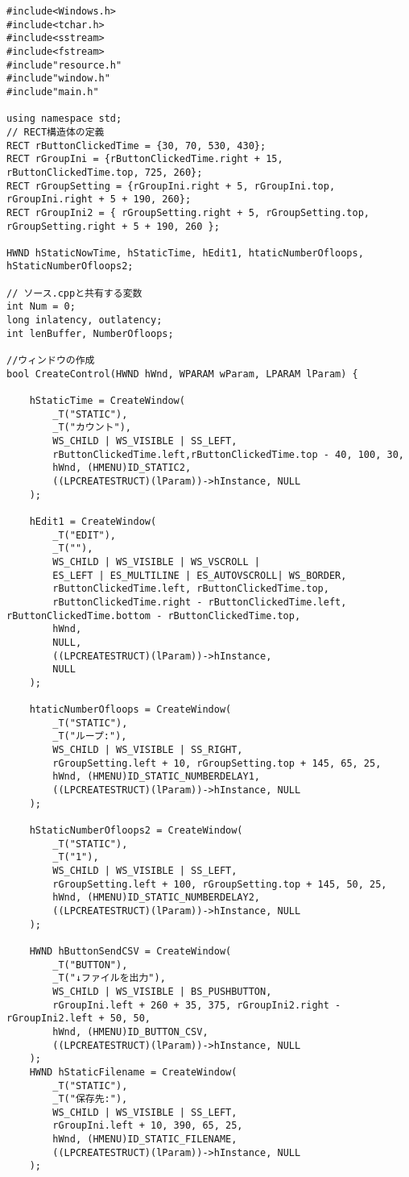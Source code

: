 \begin{lstlisting}[caption=window.cpp]
#include<Windows.h>
#include<tchar.h>
#include<sstream>
#include<fstream>
#include"resource.h"
#include"window.h"
#include"main.h"

using namespace std;
// RECT構造体の定義
RECT rButtonClickedTime = {30, 70, 530, 430};
RECT rGroupIni = {rButtonClickedTime.right + 15, rButtonClickedTime.top, 725, 260};
RECT rGroupSetting = {rGroupIni.right + 5, rGroupIni.top, rGroupIni.right + 5 + 190, 260};
RECT rGroupIni2 = { rGroupSetting.right + 5, rGroupSetting.top, rGroupSetting.right + 5 + 190, 260 };

HWND hStaticNowTime, hStaticTime, hEdit1, htaticNumberOfloops, hStaticNumberOfloops2;

// ソース.cppと共有する変数
int Num = 0;
long inlatency, outlatency;
int lenBuffer, NumberOfloops;

//ウィンドウの作成
bool CreateControl(HWND hWnd, WPARAM wParam, LPARAM lParam) {

	hStaticTime = CreateWindow(
		_T("STATIC"),
		_T("カウント"),
		WS_CHILD | WS_VISIBLE | SS_LEFT,
		rButtonClickedTime.left,rButtonClickedTime.top - 40, 100, 30,
		hWnd, (HMENU)ID_STATIC2, 
		((LPCREATESTRUCT)(lParam))->hInstance, NULL
	);

	hEdit1 = CreateWindow(
		_T("EDIT"),
		_T(""),
		WS_CHILD | WS_VISIBLE | WS_VSCROLL |
		ES_LEFT | ES_MULTILINE | ES_AUTOVSCROLL| WS_BORDER,
		rButtonClickedTime.left, rButtonClickedTime.top, 
		rButtonClickedTime.right - rButtonClickedTime.left, rButtonClickedTime.bottom - rButtonClickedTime.top,
		hWnd,
		NULL,
		((LPCREATESTRUCT)(lParam))->hInstance,
		NULL
	);

	htaticNumberOfloops = CreateWindow(
		_T("STATIC"),
		_T("ループ:"),
		WS_CHILD | WS_VISIBLE | SS_RIGHT,
		rGroupSetting.left + 10, rGroupSetting.top + 145, 65, 25,
		hWnd, (HMENU)ID_STATIC_NUMBERDELAY1,
		((LPCREATESTRUCT)(lParam))->hInstance, NULL
	);

	hStaticNumberOfloops2 = CreateWindow(
		_T("STATIC"),
		_T("1"),
		WS_CHILD | WS_VISIBLE | SS_LEFT,
		rGroupSetting.left + 100, rGroupSetting.top + 145, 50, 25, 
		hWnd, (HMENU)ID_STATIC_NUMBERDELAY2,
		((LPCREATESTRUCT)(lParam))->hInstance, NULL
	);

	HWND hButtonSendCSV = CreateWindow(
		_T("BUTTON"),
		_T("↓ファイルを出力"),
		WS_CHILD | WS_VISIBLE | BS_PUSHBUTTON,
		rGroupIni.left + 260 + 35, 375, rGroupIni2.right - rGroupIni2.left + 50, 50,
		hWnd, (HMENU)ID_BUTTON_CSV,
		((LPCREATESTRUCT)(lParam))->hInstance, NULL
	);
	HWND hStaticFilename = CreateWindow(
		_T("STATIC"),
		_T("保存先:"),
		WS_CHILD | WS_VISIBLE | SS_LEFT,
		rGroupIni.left + 10, 390, 65, 25,
		hWnd, (HMENU)ID_STATIC_FILENAME,
		((LPCREATESTRUCT)(lParam))->hInstance, NULL
	);


\end{lstlisting}
